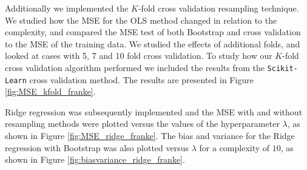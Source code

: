 \documentclass[norsk,a4paper,12pt]{article}
\begin{document}
\begin{multicols}{2}
Additionally we implemented the $K$-fold cross validation resampling technique. We studied how the MSE for the OLS method changed in relation to the complexity, and compared the MSE test of both Bootstrap and cross validation to the MSE of the training data. We studied the effects of additional folds, and looked at cases with 5, 7 and 10 fold cross validation. To study how our $K$-fold cross validation algorithm performed we included the results from the \texttt{Scikit-Learn} cross validation method. The results are presented in Figure \ref{fig:MSE_kfold_franke}.



Ridge regression was subsequently implemented and the MSE with and without resampling methods were plotted versus the values of the hyperparameter $\lambda$, as shown in Figure \ref{fig:MSE_ridge_franke}. The bias and variance for the Ridge regression with Bootstrap was also plotted versus $\lambda$ for a complexity of $10$, as shown in Figure \ref{fig:biasvariance_ridge_franke}.


\end{multicols}
\end{document}
